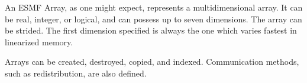 

An ESMF Array, as one might expect, represents a multidimensional array.
It can be real, integer, or logical, and can possess up to seven 
dimensions.  The array can be strided.  The first dimension specified 
is always the one which varies fastest in linearized memory. 

Arrays can be created, destroyed, copied, and indexed.  Communication
methods, such as redistribution, are also defined.



